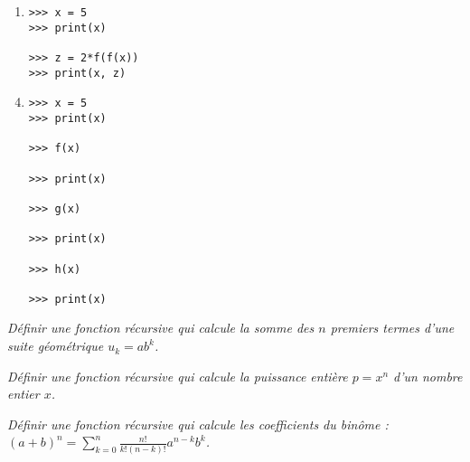 \begin{td}
\begin{minipage}[t]{7cm}
\begin{enumerate}
\item 

\begin{py}{4cm}
\begin{verbatim}
>>> x = 5
>>> print(x)

>>> z = 2*f(f(x))
>>> print(x, z)

\end{verbatim}
\end{py}


\end{enumerate}
\end{minipage}\hfill
\begin{minipage}[t]{7cm}
\begin{enumerate}\setcounter{enumi}{3}
\item 

\begin{py}{4cm}
\begin{verbatim}
>>> x = 5
>>> print(x)

>>> f(x)

>>> print(x)

>>> g(x)

>>> print(x)

>>> h(x)

>>> print(x)

\end{verbatim}
\end{py}


\end{enumerate}
\end{minipage}
\end{td}


\begin{td}\label{td:geometrie}
\em
Définir une fonction récursive qui calcule la somme des $n$ premiers termes 
d'une suite géométrique $u_k = ab^k$.
\end{td}

\begin{td}\label{td:puissance}
\em
Définir une fonction récursive qui calcule la puissance entière $p = x^n$ 
d'un nombre entier $x$.
\end{td}

\begin{td}\label{td:binome}
\em
Définir une fonction récursive qui calcule les coefficients du binôme :\\
$\displaystyle (a+b)^n = \sum_{k=0}^n \frac{n!}{k!(n-k)!}a^{n-k}b^k$.
\end{td}

